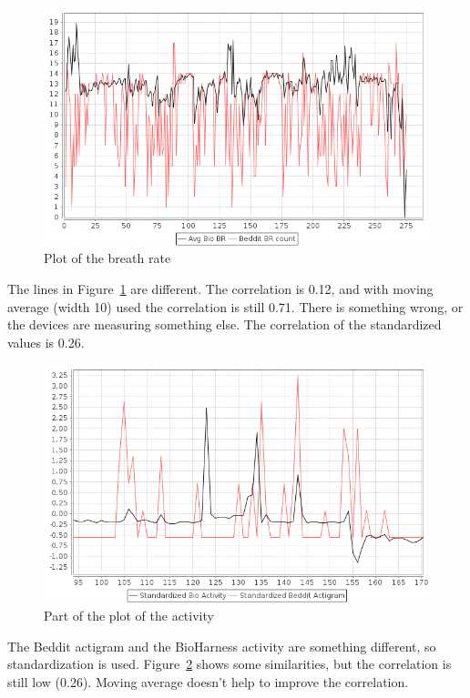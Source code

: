 			\begin{figure}[h]
				\centering
					\includegraphics[scale=0.5]{vsbr.png}
					
				\caption{Plot of the breath rate}
				\label{fig:vsbr}

			\end{figure}

			The lines in Figure~\ref{fig:vsbr} are different. The correlation is 0.12, and with moving average (width 10) used the correlation is still 0.71. There is something wrong, or the devices are measuring something else. The correlation of the standardized values is 0.26. 
						
			\begin{figure}[h]
				\centering
					\includegraphics[scale=0.5]{vsactivity.png}
					
				\caption{Part of the plot of the activity}
				\label{fig:vsactivity}

			\end{figure}
			The Beddit actigram and the BioHarness activity are something different, so standardization is used. Figure~\ref{fig:vsactivity} shows some similarities, but the correlation is still low (0.26). Moving average doesn't help to improve the correlation.


